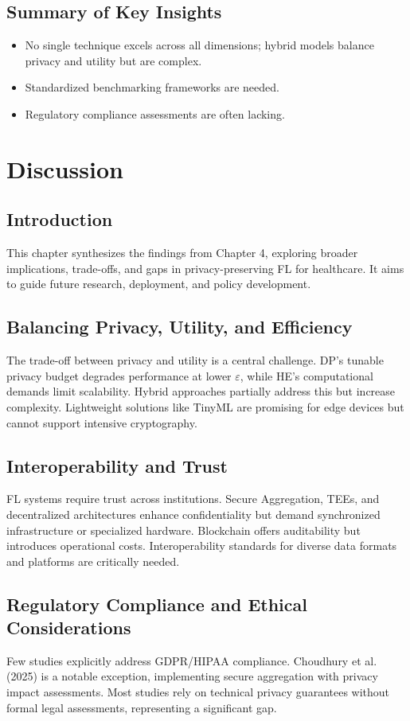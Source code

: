 \documentclass[12pt]{report}
\begin{document}
\section{Summary of Key Insights}
\begin{itemize}
    \item No single technique excels across all dimensions; hybrid models balance privacy and utility but are complex.
    \item Standardized benchmarking frameworks are needed.
    \item Regulatory compliance assessments are often lacking.
\end{itemize}

\chapter{Discussion}

\section{Introduction}
This chapter synthesizes the findings from Chapter 4, exploring broader implications, trade-offs, and gaps in privacy-preserving FL for healthcare. It aims to guide future research, deployment, and policy development.

\section{Balancing Privacy, Utility, and Efficiency}
The trade-off between privacy and utility is a central challenge. DP’s tunable privacy budget degrades performance at lower $\varepsilon$, while HE’s computational demands limit scalability. Hybrid approaches partially address this but increase complexity. Lightweight solutions like TinyML are promising for edge devices but cannot support intensive cryptography.

\section{Interoperability and Trust}
FL systems require trust across institutions. Secure Aggregation, TEEs, and decentralized architectures enhance confidentiality but demand synchronized infrastructure or specialized hardware. Blockchain offers auditability but introduces operational costs. Interoperability standards for diverse data formats and platforms are critically needed.

\section{Regulatory Compliance and Ethical Considerations}
Few studies explicitly address GDPR/HIPAA compliance. Choudhury et al. (2025) \cite{choudhury2025} is a notable exception, implementing secure aggregation with privacy impact assessments. Most studies rely on technical privacy guarantees without formal legal assessments, representing a significant gap.
\end{document}
